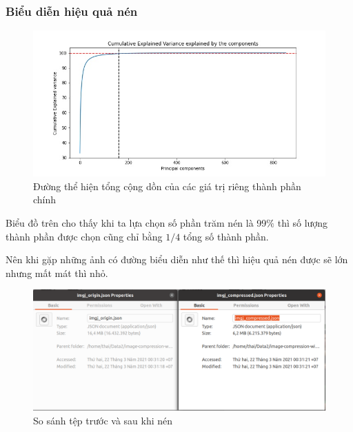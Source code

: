 \subsubsection{Biểu diễn hiệu quả nén}

\begin{center}
    \begin{figure}[htp]
        \begin{center}
            \includegraphics[scale=.5]{Chapters/content/27_pca/cumsum.jpg}
        \end{center}
        \caption{Đường thể hiện tổng cộng dồn của các giá trị riêng thành phần chính}
        \label{fig:27_9}
    \end{figure}
\end{center}

Biểu đồ trên cho thấy khi ta lựa chọn số phần trăm nén là 99$\%$ thì số lượng thành phần được chọn cũng chỉ bằng $1/4$ tổng số thành phần.


Nên khi gặp những ảnh có đường biểu diễn như thế thì hiệu quả nén được sẽ lớn nhưng mất mát thì nhỏ.

\begin{center}
    \begin{figure}[htp]
        \begin{center}
            \includegraphics[width=\textwidth,height=\textheight,keepaspectratio]{Chapters/content/27_pca/compare.png}
        \end{center}
        \caption{So sánh tệp trước và sau khi nén}
        \label{fig:27_10}
    \end{figure}
\end{center}

